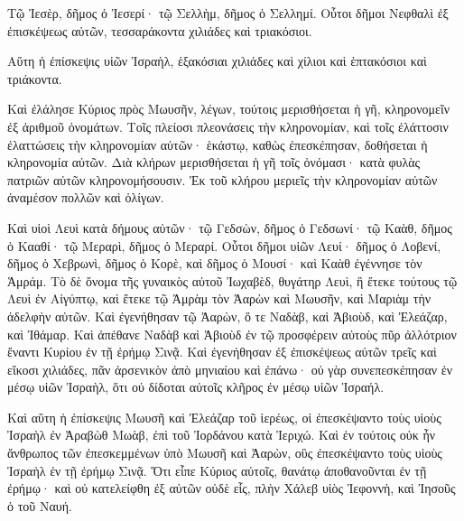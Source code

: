 {Τῷ Ἰεσὲρ, δῆμος ὁ Ἰεσερί· τῷ Σελλὴμ, δῆμος ὁ Σελλημί.
Οὗτοι δῆμοι Νεφθαλὶ ἐξ ἐπισκέψεως αὐτῶν, τεσσαράκοντα χιλιάδες καὶ τριακόσιοι.
\par }{\PP {}Αὕτη ἡ ἐπίσκεψις υἱῶν Ἰσραὴλ, ἑξακόσιαι χιλιάδες καὶ χίλιοι καὶ ἑπτακόσιοι καὶ τριάκοντα.
\par }{\PP {}Καὶ ἐλάλησε Κύριος πρὸς Μωυσῆν, λέγων,
τούτοις μερισθήσεται ἡ γῆ, κληρονομεῖν ἐξ ἀριθμοῦ ὀνομάτων.
Τοῖς πλείοσι πλεονάσεις τὴν κληρονομίαν, καὶ τοῖς ἐλάττοσιν ἐλαττώσεις τὴν κληρονομίαν αὐτῶν· ἑκάστῳ, καθὼς ἐπεσκέπησαν, δοθήσεται ἡ κληρονομία αὐτῶν.
Διὰ κλήρων μερισθήσεται ἡ γῆ τοῖς ὀνόμασι· κατὰ φυλὰς πατριῶν αὐτῶν κληρονομήσουσιν.
Ἐκ τοῦ κλήρου μεριεῖς τὴν κληρονομίαν αὐτῶν ἀναμέσον πολλῶν καὶ ὀλίγων.
\par }{\PP {}Καὶ υἱοὶ Λευὶ κατὰ δήμους αὐτῶν· τῷ Γεδσὼν, δῆμος ὁ Γεδσωνί· τῷ Καὰθ, δῆμος ὁ Κααθί· τῷ Μεραρὶ, δῆμος ὁ Μεραρί.
Οὗτοι δῆμοι υἱῶν Λευί· δῆμος ὁ Λοβενί, δῆμος ὁ Χεβρωνὶ, δῆμος ὁ Κορὲ, καὶ δῆμος ὁ Μουσί· καὶ Καὰθ ἐγέννησε τὸν Ἁμράμ.
Τὸ δὲ ὄνομα τῆς γυναικὸς αὐτοῦ Ἰωχαβὲδ, θυγάτηρ Λευὶ, ἣ ἔτεκε τούτους τῷ Λευὶ ἐν Αἰγύπτῳ, καὶ ἔτεκε τῷ Ἀμρὰμ τὸν Ἀαρὼν καὶ Μωυσῆν, καὶ Μαριὰμ τὴν ἀδελφὴν αὐτῶν.
Καὶ ἐγενήθησαν τῷ Ἀαρὼν, ὅ τε Ναδὰβ, καὶ Ἀβιοὺδ, καὶ Ἐλεάζαρ, καὶ Ἰθάμαρ.
Καὶ ἀπέθανε Ναδὰβ καὶ Ἀβιοὺδ ἐν τῷ προσφέρειν αὐτοὺς πῦρ ἀλλότριον ἔναντι Κυρίου ἐν τῇ ἐρήμῳ Σινᾷ.
Καὶ ἐγενήθησαν ἐξ ἐπισκέψεως αὐτῶν τρεῖς καὶ εἴκοσι χιλιάδες, πᾶν ἀρσενικὸν ἀπὸ μηνιαίου καὶ ἐπάνω· οὐ γὰρ συνεπεσκέπησαν ἐν μέσῳ υἱῶν Ἰσραὴλ, ὅτι οὐ δίδοται αὐτοῖς κλῆρος ἐν μέσῳ υἱῶν Ἰσραήλ.
\par }{\PP {}Καὶ αὕτη ἡ ἐπίσκεψις Μωυσῆ καὶ Ἐλεάζαρ τοῦ ἱερέως, οἱ ἐπεσκέψαντο τοὺς υἱοὺς Ἰσραὴλ ἐν Ἀραβὼθ Μωὰβ, ἐπὶ τοῦ Ἰορδάνου κατὰ Ἱεριχώ.
Καὶ ἐν τούτοις οὐκ ἦν ἄνθρωπος τῶν ἐπεσκεμμένων ὑπὸ Μωυσῆ καὶ Ἀαρὼν, οὓς ἐπεσκέψαντο τοὺς υἱοὺς Ἰσραὴλ ἐν τῇ ἐρήμῳ Σινᾷ.
Ὅτι εἶπε Κύριος αὐτοῖς, θανάτῳ ἀποθανοῦνται ἐν τῇ ἐρήμῳ· καὶ οὐ κατελείφθη ἐξ αὐτῶν οὐδὲ εἷς, πλὴν Χάλεβ υἱὸς Ἰεφοννὴ, καὶ Ἰησοῦς ὁ τοῦ Ναυή.

}
